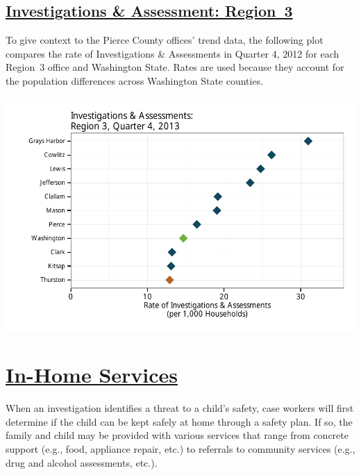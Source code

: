 \documentclass{article}\usepackage{graphicx, color}
\makeatletter
\def\maxwidth{ %
  \ifdim\Gin@nat@width>\linewidth
    \linewidth
  \else
    \Gin@nat@width
  \fi
}
\newenvironment{knitrout}{}{} %
\makeatother
\begin{document}
\subsection{
    \href{http://www.partnersforourchildren.org//child-well-being/visualizations/investigations-assessments/trends}
    {Investigations \& Assessment: Region~3}}
To give context to the Pierce County offices' trend data, the following plot compares the rate of Investigations \& Assessments in Quarter 4, 2012 for each Region~3 office and Washington State.  Rates are used because they account for the population differences across Washington State counties.
\nopagebreak[3]
\begin{knitrout}
\color{fgcolor}

{\centering \includegraphics[width=\maxwidth]{figure/ia_context} 

}



\end{knitrout}



\section{\href{http://www.partnersforourchildren.org/child-well-being/visualizations/home-services/trends}
    {In-Home Services}
}
When an investigation identifies a threat to a child's safety, case workers will first determine if the child can be kept safely at home through a safety plan. If so, the family and child may be provided with various services that range from concrete support (e.g., food, appliance repair, etc.) to referrals to community services (e.g., drug and alcohol assessments, etc.).
\end{document}
